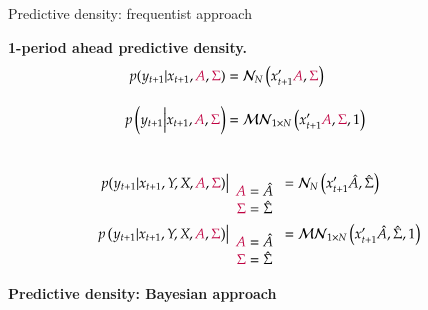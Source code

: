 \documentclass[notes,blackandwhite,mathsans,usenames,dvipsnames]{beamer}
\begin{document}
\begin{frame}{Predictive density: frequentist approach}

\textbf{1-period ahead predictive density.}
\begin{align*}
p(y_{t+1}|x_{t+1},{\color{purple}A},{\color{purple}\Sigma}) &=\mathcal{N}_N\left(x_{t+1}'{\color{purple}A},{\color{purple}\Sigma}\right)\\[2ex]
p\left(y_{t+1}\Big|x_{t+1}, {\color{purple}A},{\color{purple}\Sigma}\right) &= \mathcal{MN}_{1\times N}\left( x_{t+1}'{\color{purple}A}, {\color{purple}\Sigma}, 1 \right)\\[5ex]
p(y_{t+1}|x_{t+1},Y,X,{\color{purple}A},{\color{purple}\Sigma})&\big|_{\begin{array}{c}{\color{purple}A}=\hat{A}\\{\color{purple}\Sigma}=\hat\Sigma\end{array}} =\mathcal{N}_N\left(x_{t+1}'\hat{A},\hat\Sigma\right)\\
p\left(y_{t+1}|x_{t+1},Y,X, {\color{purple}A},{\color{purple}\Sigma}\right)&\big|_{\begin{array}{c}{\color{purple}A}=\hat{A}\\{\color{purple}\Sigma}=\hat\Sigma\end{array}} = \mathcal{MN}_{1\times N}\left( x_{t+1}'\hat{A}, \hat\Sigma, 1 \right)
\end{align*} 

\end{frame}








{
\begin{frame}

\begin{adjustwidth}{-0.5cm}{0cm}
\vspace{8.3cm}\Large
\textbf{{\color{mcxs2}Predictive density:} {\color{purple}Bayesian approach}}
\end{adjustwidth}

\end{frame}
}
\end{document}
